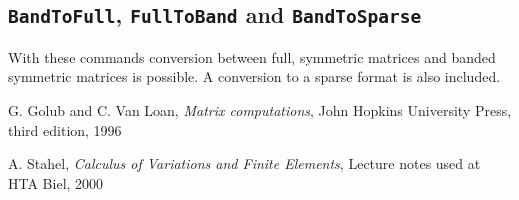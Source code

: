 \documentclass[11pt]{article}
\begin{document}
\subsection{\texttt{BandToFull}, \texttt{FullToBand} and \texttt{BandToSparse}}
With these commands conversion between full, symmetric matrices and banded
symmetric matrices is possible. A conversion to a sparse format is also
included.


\begin{thebibliography}{2}

G. Golub and C. Van Loan,
\newblock \textit{Matrix computations},
John Hopkins University Press, third edition, 1996

A. Stahel,
\newblock \textit{Calculus of Variations and Finite Elements},
Lecture notes used at HTA Biel, 2000

\end{thebibliography}


\end{document}
